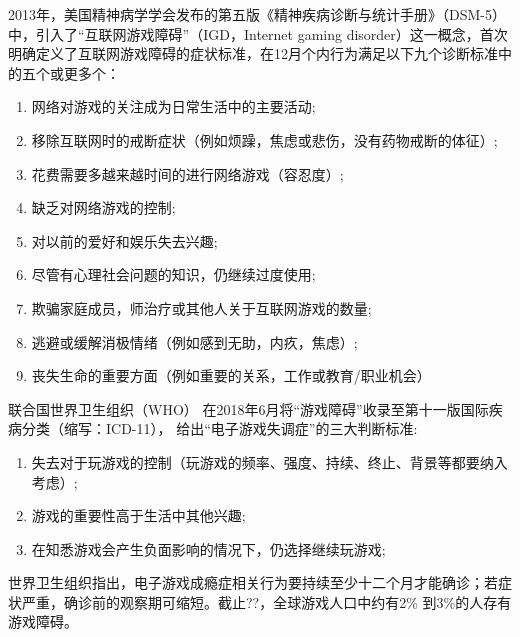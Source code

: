 2013年，美国精神病学学会发布的第五版《精神疾病诊断与统计手册》（DSM-5）中，引入了“互联网游戏障碍”（IGD，Internet gaming disorder）这一概念，首次明确定义了互联网游戏障碍的症状标准，在12月个内行为满足以下九个诊断标准中的五个或更多个：
\begin{enumerate}
\item 网络对游戏的关注成为日常生活中的主要活动;
\item 移除互联网时的戒断症状（例如烦躁，焦虑或悲伤，没有药物戒断的体征）;
 \item 花费需要多越来越时间的进行网络游戏（容忍度）;
\item 缺乏对网络游戏的控制;
\item 对以前的爱好和娱乐失去兴趣;
\item 尽管有心理社会问题的知识，仍继续过度使用;
\item 欺骗家庭成员，师治疗或其他人关于互联网游戏的数量;
\item 逃避或缓解消极情绪（例如感到无助，内疚，焦虑）;
\item 丧失生命的重要方面（例如重要的关系，工作或教育/职业机会）
\end{enumerate}


联合国世界卫生组织（WHO）%
在2018年6月将“游戏障碍”收录至第十一版国际疾病分类（缩写：ICD-11），
给出“电子游戏失调症”的三大判断标准:
\begin{enumerate}
\item 失去对于玩游戏的控制（玩游戏的频率、强度、持续、终止、背景等都要纳入考虑）;

\item 游戏的重要性高于生活中其他兴趣;

\item 在知悉游戏会产生负面影响的情况下，仍选择继续玩游戏;
 \end{enumerate}
 世界卫生组织指出，电子游戏成瘾症相关行为要持续至少十二个月才能确诊；若症状严重，确诊前的观察期可缩短。截止??，全球游戏人口中约有2\% 到3\%的人存有游戏障碍。

